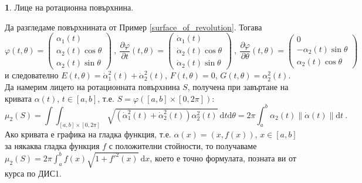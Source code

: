 \documentclass[11pt]{article}
\numberwithin{equation}{section}
\numberwithin{figure}{section}
\numberwithin{table}{section}
\theoremstyle{plain}
\theoremstyle{definition}
\theoremstyle{remark}
\theoremstyle{definition}
\theoremstyle{remark}
\theoremstyle{plain}
\theoremstyle{definition}
\theoremstyle{definition}
\newtheorem{example}[thm]{\protect\examplename}
\theoremstyle{plain}
\theoremstyle{plain}
\theoremstyle{plain}
\theoremstyle{definition}
\theoremstyle{plain}
\providecommand{\examplename}{Пример}
\begin{document}
\begin{example} \label{area_surface_of_revolution} Лице на ротационна повърхнина.

Да разгледаме повърхнината от Пример \ref{surface_of_revolution}. Тогава
$$\varphi(t,\theta)=\left( \begin{array}{c}\alpha_1(t)\\ \alpha_2(t)\cos \theta\\ \alpha_2(t)\sin \theta\end{array}\right) \ ,  \ \frac{\partial\varphi}{\partial t}(t,\theta)=\left( \begin{array}{c}\dot\alpha_1(t)\\ \dot\alpha_2(t)\cos \theta\\ \dot\alpha_2(t)\sin \theta\end{array}\right) \ , \ \frac{\partial\varphi}{\partial \theta}(t,\theta)=\left( \begin{array}{c}0\\ -\alpha_2(t)\sin \theta\\ \alpha_2(t)\cos \theta\end{array}\right)$$
 и следователно $E(t,\theta)=\dot \alpha_1^2(t)+\dot \alpha_2^2(t)$, $F(t,\theta)=0$, $G(t,\theta)=\alpha_2^2(t)$. Да намерим лицето на ротационната повърхнина $S$, получена при завъртане на кривата $\alpha(t)$, $t\in [a,b]$, т.е. $S=\varphi ([a,b]\times [0,2\pi])$:
 $$\mu_2(S)= \int\int_{[a,b]\times [0,2\pi]} \sqrt{\left(\dot \alpha_1^2(t)+\dot \alpha_2^2(t)\right)\alpha_2^2(t)} \ \textrm{d}t\textrm{d}\theta = 2\pi \int_a^b \alpha_2(t)\left\|\dot \alpha (t)\right\|\textrm{d}t \ .$$
 Ако кривата е графика на гладка функция, т.е. $\alpha(x)=(x,f(x))$, $x\in [a,b]$ за някаква гладка функция $f$ с положителни стойности, то получаваме $\mu_2(S)= 2\pi \int_a^b f(x)\sqrt{1+{f'}^2(x)} \ \textrm{d}x$, което е точно формулата, позната ви от курса по ДИС1.
\end{example}
\end{document}
